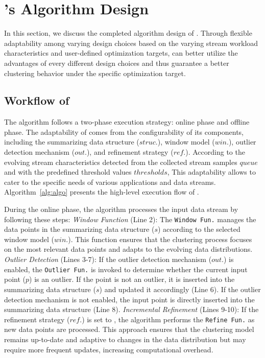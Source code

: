 \section{\algo's Algorithm Design}
\label{sec:selection}
In this section, we discuss the completed algorithm design of \algo. Through flexible adaptability among varying design choices based on the varying stream workload characteristics and user-defined optimization targets, \algo can better utilize the advantages of every different design choices and thus guarantee a better clustering behavior under the specific optimization target.

\subsection{Workflow of \algo}
The \algo algorithm follows a two-phase execution strategy: online phase and offline phase. The adaptability of \algo comes from the configurability of its components, including the summarizing data structure ($struc.$), window model ($win.$), outlier detection mechanism ($out.$), and refinement strategy ($ref.$). According to the evolving stream characteristics detected from the collected stream samples $queue$ and with the predefined threshold values $thresholds$, This adaptability allows \algo to cater to the specific needs of various applications and data streams.
Algorithm~\ref{alg:algo} presents the high-level execution flow of \algo. 

During the online phase, the algorithm processes the input data stream by following these steps:
\emph{Window Function} (Line 2): The \texttt{Window Fun.} manages the data points in the summarizing data structure ($s$) according to the selected window model ($win.$). This function ensures that the clustering process focuses on the most relevant data points and adapts to the evolving data distributions.
\emph{Outlier Detection} (Lines 3-7): If the outlier detection mechanism ($out.$) is enabled, the \texttt{Outlier Fun.} is invoked to determine whether the current input point ($p$) is an outlier. If the point is not an outlier, it is inserted into the summarizing data structure ($s$) and updated it accordingly (Line 6). If the outlier detection mechanism is not enabled, the input point is directly inserted into the summarizing data structure (Line 8).
\emph{Incremental Refinement} (Lines 9-10): If the refinement strategy ($ref.$) is set to \incrementalRefinement, the algorithm performs the \texttt{Refine Fun.} as new data points are processed. This approach ensures that the clustering model remains up-to-date and adaptive to changes in the data distribution but may require more frequent updates, increasing computational overhead.


